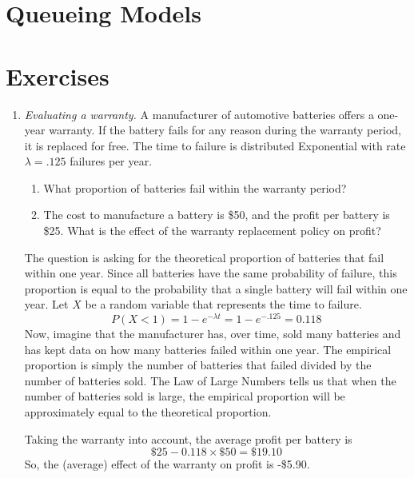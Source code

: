 \section{Queueing Models}

\section{Exercises}

\begin{enumerate}
  
\subsubsection*{Modeling with Probability Distributions.}

\item \emph{Evaluating a warranty.}
  A manufacturer of automotive batteries offers a one-year
  warranty. If the battery fails for any reason during the warranty
  period, it is replaced for free. The time to failure is distributed
  Exponential with rate $\lambda=.125$ failures per year.
\begin{enumerate}
\item What proportion of batteries fail within the warranty period?
\item The cost to manufacture a battery is \$50, and the profit
per battery is \$25. What is the effect of the warranty replacement
policy on profit? \label{ex:profit}
\end{enumerate}

\begin{solution}
  \bs The question is asking for the theoretical proportion of
  batteries that fail within one year. Since all batteries have the
  same probability of failure, this proportion is equal to the
  probability that a single battery will fail within one year. Let $X$
  be a random variable that represents the time to failure.
\[ P(X<1) = 1-e^{-\lambda t} = 1 - e^{-.125} = 0.118 \]
Now, imagine that the manufacturer has, over time,
  sold many batteries and has kept data on how many batteries failed
  within one year. The empirical proportion is simply the number
  of batteries that failed divided by the number of batteries sold.
  The Law of Large Numbers tells us that when the number of batteries
  sold is large, the empirical proportion will be approximately
  equal to the theoretical proportion.

Taking the warranty into account, the average profit per battery is
\[ \$25 - 0.118\times \$50 = \$19.10 \]
So, the (average) effect of the warranty on profit is -\$5.90.
\end{solution}


\end{enumerate}
